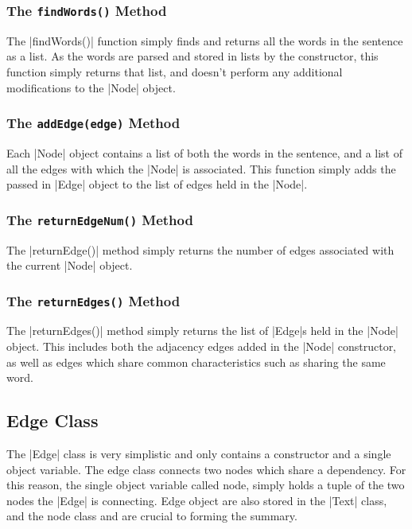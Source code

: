 	\subsubsection{The {\tt findWords()} Method}
	The |findWords()| function simply finds and returns all the words in the sentence as a list. As the words are parsed and stored in lists by the constructor, this function simply returns that list, and doesn't perform any additional modifications to the |Node| object.
	
	\subsubsection{The {\tt addEdge(edge)} Method}	
	Each |Node| object contains a list of both the words in the sentence, and a list of all the edges with which the |Node| is associated. This function simply adds the passed in |Edge| object to the list of edges held in the |Node|.
	
	\subsubsection{The {\tt returnEdgeNum()} Method}
	The |returnEdge()| method simply returns the number of edges associated with the current |Node| object.
	
	\subsubsection{The {\tt returnEdges()} Method}
	The |returnEdges()| method simply returns the list of |Edge|s held in the |Node| object. This includes both the adjacency edges added in the |Node| constructor, as well as edges which share common characteristics such as sharing the same word.
		
\subsection{Edge Class}
	
	The |Edge| class is very simplistic and only contains a constructor and a single object variable. The edge class connects two nodes which share a dependency. For this reason, the single object variable called node, simply holds a tuple of the two nodes the |Edge| is connecting. Edge object are also stored in the |Text| class, and the node class and are crucial to forming the summary.
	
